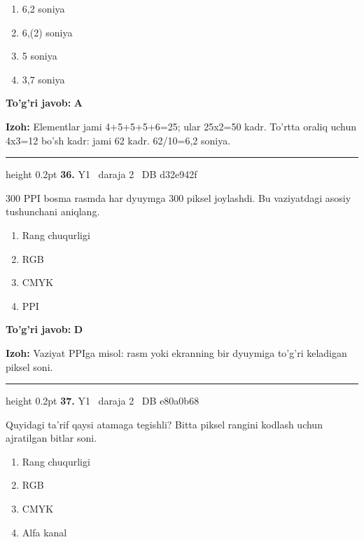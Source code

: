\documentclass[10pt,a4paper,oneside]{article}
\begin{document}
\begin{enumerate}[label=\Alph*),leftmargin=9mm]
\item 6,2 soniya
\item 6,(2) soniya
\item 5 soniya
\item 3,7 soniya
\end{enumerate}
\begin{tcolorbox}[enhanced,breakable,colback=teal!4,colframe=teal!45!black,boxrule=0.45pt,arc=1.2mm,left=2.8mm,right=2.8mm,top=2mm,bottom=2mm,before skip=2mm,after skip=2mm]
\textbf{\color{teal}To'g'ri javob:} \textbf{A}
\par\smallskip
\textbf{Izoh:} Elementlar jami 4+5+5+5+6=25; ular 25x2=50 kadr. To'rtta oraliq uchun 4x3=12 bo'sh kadr: jami 62 kadr. 62/10=6,2 soniya.
\end{tcolorbox}
\vspace{2mm}\hrule height 0.2pt \vspace{4mm}
\hypertarget{q36}{\textbf{\color{ink}36.}}  {\color{muted}\scriptsize Y1 \textbullet\ daraja 2 \textbullet\ DB d32e942f}
\par
300 PPI bosma rasmda har dyuymga 300 piksel joylashdi. Bu vaziyatdagi asosiy tushunchani aniqlang.
\begin{enumerate}[label=\Alph*),leftmargin=9mm]
\item Rang chuqurligi
\item RGB
\item CMYK
\item PPI
\end{enumerate}
\begin{tcolorbox}[enhanced,breakable,colback=teal!4,colframe=teal!45!black,boxrule=0.45pt,arc=1.2mm,left=2.8mm,right=2.8mm,top=2mm,bottom=2mm,before skip=2mm,after skip=2mm]
\textbf{\color{teal}To'g'ri javob:} \textbf{D}
\par\smallskip
\textbf{Izoh:} Vaziyat PPIga misol: rasm yoki ekranning bir dyuymiga to'g'ri keladigan piksel soni.
\end{tcolorbox}
\vspace{2mm}\hrule height 0.2pt \vspace{4mm}
\hypertarget{q37}{\textbf{\color{ink}37.}}  {\color{muted}\scriptsize Y1 \textbullet\ daraja 2 \textbullet\ DB e80a0b68}
\par
Quyidagi ta'rif qaysi atamaga tegishli? Bitta piksel rangini kodlash uchun ajratilgan bitlar soni.
\begin{enumerate}[label=\Alph*),leftmargin=9mm]
\item Rang chuqurligi
\item RGB
\item CMYK
\item Alfa kanal
\end{enumerate}
\end{document}

